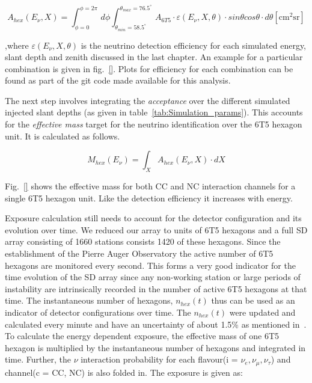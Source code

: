 \begin{equation}
  \label{eq:nu_accep}
  A_{hex}(E_{\nu}, X)  = \int^{\phi = 2\pi}_{\phi = 0} \,d\phi \int_{\theta_{min} = 58.5^{\circ}}^{\theta_{max}= 76.5^{\circ}}  \, A_{6T5} \cdot \varepsilon(E_{\nu}, X, \theta) \cdot sin\theta cos\theta \cdot d\theta    \mathrm{[cm^2 sr]}
\end{equation}

,where $\varepsilon(E_{\nu}, X, \theta)$ is the neutrino detection efficiency for each simulated energy, slant depth and zenith discussed in the last chapter. An example for a particular combination is given in fig.~\ref{}. Plots for efficiency for each combination can be found as part of the git code made available for this analysis. 

The next step involves integrating the \textit{acceptance} over the different simulated injected slant depths (as given in table~\ref{tab:Simulation_params}). This accounts for the \textit{effective mass} target for the neutrino identification over the 6T5 hexagon unit. It is calculated as follows. 

\begin{equation}
  \label{eq:nu_eff_mass}
  M_{hex}(E_{\nu}) = \int_X A_{hex}(E_{\nu}, X) \cdot dX
\end{equation}

Fig.~\ref{} shows the effective mass for both CC and NC interaction channels for a single 6T5 hexagon unit. Like the detection efficiency it increases with energy. 

Exposure calculation still needs to account for the detector configuration and its evolution over time. We reduced our array to units of 6T5 hexagons and a full SD array consisting of 1660 stations consists 1420 of these hexagons. Since the establishment of the Pierre Auger Observatory the active number of 6T5 hexagons are monitored every second. This forms a very good indicator for the time evolution of the SD array since any non-working station or large periods of instability are intrinsically recorded in the number of active 6T5 hexagons at that time. The instantaneous number of hexagons, $n_{hex}(t)$ thus can be used as an indicator of detector configurations over time. The $n_{hex}(t)$ were updated and calculated every minute and have an uncertainty of about 1.5\% as mentioned in~\cite{PierreAuger:2010zof}. To calculate the energy dependent exposure, the effective mass of one 6T5 hexagon is multiplied by the instantaneous number of hexagons and integrated in time. Further, the $\nu$ interaction probability for each flavour(i = $\nu_e, \nu_{\mu}, \nu_{\tau}$) and channel(c = CC, NC) is also folded in. The exposure is given as:

